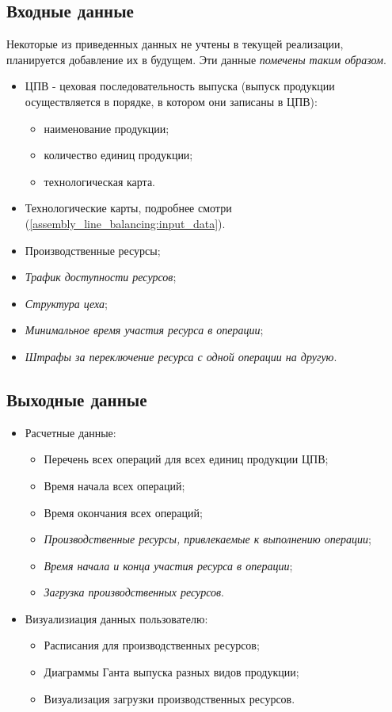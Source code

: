 \subsection{Входные данные}
Некоторые из приведенных данных не учтены в текущей реализации, планируется добавление их в будущем. Эти данные \textit{помечены таким образом}.

\begin{itemize}
	\item ЦПВ - цеховая последовательность выпуска (выпуск продукции осуществляется в порядке, в котором они записаны в ЦПВ):
		\begin{itemize}
			\item наименование продукции;
			\item количество единиц продукции;	
			\item технологическая карта.
		\end{itemize}			
	\item Технологические карты, подробнее смотри (\ref{assembly_line_balancing:input_data}).
	\item Производственные ресурсы;
	\item \textit{Трафик доступности ресурсов};
	\item \textit{Структура цеха};
	\item \textit{Минимальное время участия ресурса в операции};
	\item \textit{Штрафы за переключение ресурса с одной операции на другую}. 
\end{itemize}

\subsection{Выходные данные}

\begin{itemize}
	\item Расчетные данные:	
		\begin{itemize}
			\item Перечень всех операций для всех единиц продукции ЦПВ;
			\item Время начала всех операций;
			\item Время окончания всех операций;
			\item \textit{Производственные ресурсы, привлекаемые к выполнению операции};
			\item \textit{Время начала и конца участия ресурса в операции};
			\item \textit{Загрузка производственных ресурсов}.
		\end{itemize}		
	\item Визуализиация данных пользователю:
		\begin{itemize}
			\item Расписания для производственных ресурсов;
			\item Диаграммы Ганта выпуска разных видов продукции;
			\item Визуализация загрузки производственных ресурсов.
		\end{itemize}		 
\end{itemize}

